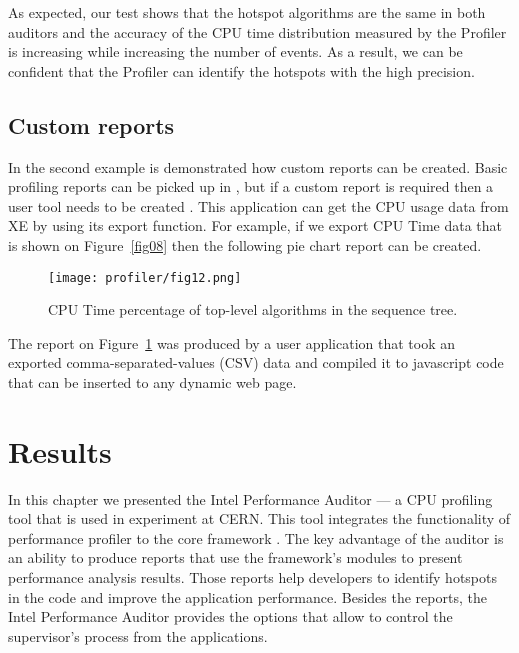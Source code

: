 As expected, our test shows that the hotspot algorithms are the same in both
auditors and the accuracy of the CPU time distribution measured by the Profiler
is increasing while increasing the number of events. As a result, we can be
confident that the Profiler can identify the hotspots with the high precision.

\subsection{Custom reports}

In the second example is demonstrated how custom reports can be created. Basic
profiling reports can be picked up in
\amp, but if a custom report is required then a user tool needs to be created .
This application can get the CPU usage data from \iamp XE by using
its export function. For example, if we export CPU Time data that is shown on
Figure~\ref{fig08} then the following pie chart report can be created.

\begin{figure}[H]
\begin{minipage}{\textwidth}
\begin{center}
\texttt{[image: profiler/fig12.png]}
\caption{\label{fig12}CPU Time percentage of top-level algorithms in the \gaudi sequence tree.}
\end{center}
\end{minipage}
\end{figure}

The report on Figure~\ref{fig12} was produced by a user application that took
an exported  comma-separated-values (CSV) data and compiled it to javascript
code that can be inserted to any dynamic web page.

\section{Results}
In this chapter we presented the \gaudi Intel Performance Auditor --- a CPU
profiling tool that is used in \lhcb experiment at CERN. This tool integrates
the functionality of \iamp performance profiler to the \lhcb core framework
\gaudi. The key advantage of the auditor is an ability to produce reports that
use the framework's modules to present performance analysis results. Those
reports help  developers to identify hotspots in the code and improve the
application performance. Besides the reports, the \gaudi Intel Performance
Auditor provides the options that allow to control the \iamp supervisor's
process from the \gaudi applications.

